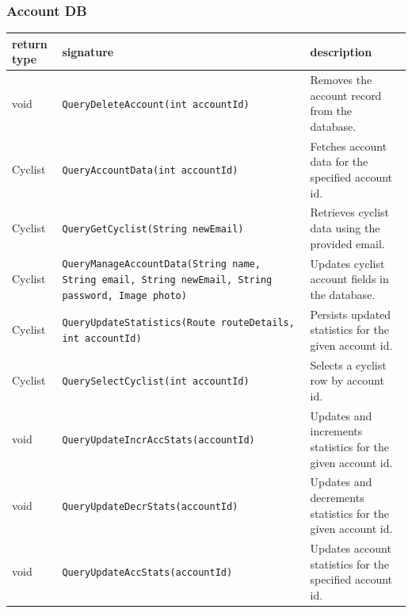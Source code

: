 \subsubsection{Account DB}
\begin{table}[H]
\centering
\small
\begin{tabularx}{\textwidth}{|L{3cm}|L{6.5cm}|Y|}
\hline
\textbf{return type} & \textbf{signature} & \textbf{description} \\
\hline
void & \texttt{QueryDeleteAccount(int accountId)} & Removes the account record from the database. \\
\hline
Cyclist & \texttt{QueryAccountData(int accountId)} & Fetches account data for the specified account id. \\
\hline
Cyclist & \texttt{QueryGetCyclist(String newEmail)} & Retrieves cyclist data using the provided email. \\
\hline
Cyclist & \texttt{QueryManageAccountData(String name, String email, String newEmail, String password, Image photo)} & Updates cyclist account fields in the database. \\
\hline
Cyclist & \texttt{QueryUpdateStatistics(Route routeDetails, int accountId)} & Persists updated statistics for the given account id. \\
\hline
Cyclist & \texttt{QuerySelectCyclist(int accountId)} & Selects a cyclist row by account id. \\
\hline
void & \texttt{QueryUpdateIncrAccStats(accountId)} & Updates and increments statistics for the given account id. \\
\hline
void & \texttt{QueryUpdateDecrStats(accountId)} & Updates and decrements statistics for the given account id. \\
\hline
void & \texttt{QueryUpdateAccStats(accountId)} & Updates account statistics for the specified account id. \\
\hline
\end{tabularx}
\end{table}
